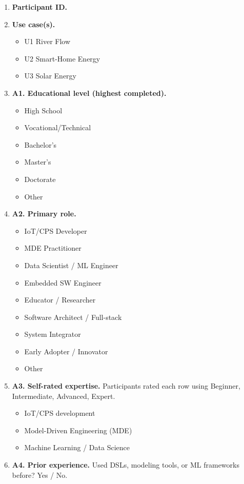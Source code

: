 \begin{enumerate}[leftmargin=*]
    \item \textbf{Participant ID.}
    \item \textbf{Use case(s).}
    \begin{itemize}
        \item U1 River Flow
        \item U2 Smart-Home Energy
        \item U3 Solar Energy
    \end{itemize}

    \item \textbf{A1. Educational level (highest completed).}
    \begin{itemize}
        \item High School
        \item Vocational/Technical
        \item Bachelor's
        \item Master's
        \item Doctorate
        \item Other
    \end{itemize}

    \item \textbf{A2. Primary role.}
    \begin{itemize}
        \item IoT/CPS Developer
        \item MDE Practitioner
        \item Data Scientist / ML Engineer
        \item Embedded SW Engineer
        \item Educator / Researcher
        \item Software Architect / Full-stack
        \item System Integrator
        \item Early Adopter / Innovator
        \item Other
    \end{itemize}

    \item \textbf{A3. Self-rated expertise.}
    Participants rated each row using Beginner, Intermediate, Advanced, Expert.
    \begin{itemize}
        \item IoT/CPS development
        \item Model-Driven Engineering (MDE)
        \item Machine Learning / Data Science
    \end{itemize}

    \item \textbf{A4. Prior experience.}
    Used DSLs, modeling tools, or ML frameworks before? Yes / No.
\end{enumerate}

